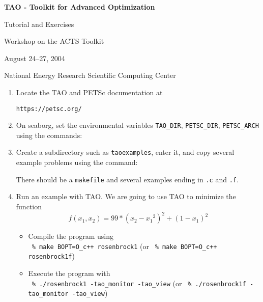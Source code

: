 \documentclass[11pt]{article}
\begin{document}
\begin{center}
{\bf
TAO - Toolkit for Advanced Optimization

Tutorial and Exercises

\vspace{0.25in}

Workshop on the ACTS Toolkit

August 24--27, 2004

National Energy Research Scientific Computing Center
}
\end{center}
\vspace{0.25in}

\begin{enumerate}

\item Locate the TAO and PETSc documentation at
\begin{alltt}
https://petsc.org/
\end{alltt}

\item On seaborg, set the environmental variables
\texttt{TAO\_DIR}, \texttt{PETSC\_DIR}, \texttt{PETSC\_ARCH}
using the commands:
\begin{alltt}
% module load tao/1.7
% module load petsc/2.2.1
\end{alltt}

\item Create a subdirectory such as \texttt{taoexamples}, enter it, and copy several example problems using the
command:
\begin{alltt}
% mkdir taoexamples
% cd taoexamples
% cp -R \$TAO_DIR/src/unconstrained/tutorials/* .
% ls
\end{alltt}
There should be a \texttt{makefile} and several examples ending in \texttt{.c} and \texttt{.f}.

\item Run an example with TAO.
We are going to use TAO to minimize the function
\[
    f(x_1,x_2) = 99*(x_2-{x_1}^2)^2 + (1-x_1)^2
\]

\begin{itemize}

 \item Compile the program using \\
  \quad \texttt{ \% make BOPT=O\_c++ rosenbrock1}
  (or \texttt{ \% make BOPT=O\_c++ rosenbrock1f})

 \item Execute the program with \\
  \quad \texttt{ \% ./rosenbrock1 -tao\_monitor -tao\_view} (or
  \texttt{ \% ./rosenbrock1f -tao\_monitor -tao\_view})


\end{itemize}
\end{enumerate}
\end{document}
